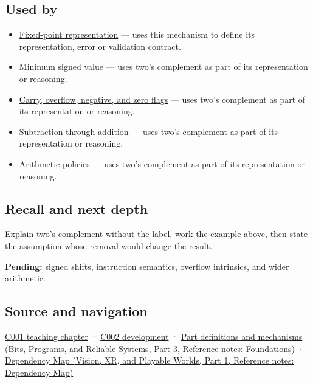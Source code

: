 \subsection{Used by}\label{appendix-4fbc03d20829-used-by}

\hypertarget{appendix-4fbc03d20829-used-by}{}

\begin{itemize}
\item
  \hyperref[appendix-1d0dbe8924cc]{Fixed-point representation} --- uses this mechanism to define its representation, error or validation contract.
\item
  \hyperref[appendix-05f39b10364d]{Minimum signed value} --- uses two's complement as part of its representation or reasoning.
\item
  \hyperref[appendix-8d687c9c08ab]{Carry, overflow, negative, and zero flags} --- uses two's complement as part of its representation or reasoning.
\item
  \hyperref[appendix-1c7df340573e]{Subtraction through addition} --- uses two's complement as part of its representation or reasoning.
\item
  \hyperref[appendix-2ed044358b82]{Arithmetic policies} --- uses two's complement as part of its representation or reasoning.
\end{itemize}

\subsection{Recall and next depth}\label{appendix-4fbc03d20829-recall-and-next-depth}

\hypertarget{appendix-4fbc03d20829-recall-and-next-depth}{}

Explain two's complement without the label, work the example above, then state the assumption whose removal would change the result.

\textbf{Pending:} signed shifts, instruction semantics, overflow intrinsics, and wider arithmetic.

\subsection{Source and navigation}\label{appendix-4fbc03d20829-source-and-navigation}

\hypertarget{appendix-4fbc03d20829-source-and-navigation}{}

\hyperref[01-foundations-i-ch001-from-a-signal-to-an-interpretation]{C001 teaching chapter} · \hyperref[01-foundations-i-ch001-arithmetic-becomes-a-policy]{C002 development} · \href{../01-Bits-Programs-and-Reliable-Systems-P03/main.pdf\#appendix-fd090d982a15}{Part definitions and mechanisms (Bits, Programs, and Reliable Systems, Part 3, Reference notes: Foundations)} · \href{../07-Vision-XR-and-Playable-Worlds-P01/main.pdf\#appendix-4ad47bdd269a}{Dependency Map (Vision, XR, and Playable Worlds, Part 1, Reference notes: Dependency Map)}
